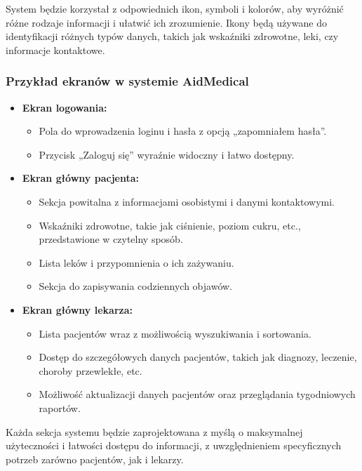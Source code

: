 \quad System będzie korzystał z odpowiednich ikon, symboli i kolorów, aby wyróżnić różne rodzaje informacji i ułatwić ich zrozumienie. Ikony będą używane do identyfikacji różnych typów danych, takich jak wskaźniki zdrowotne, leki, czy informacje kontaktowe.

\subsubsection{Przykład ekranów w systemie AidMedical}

\begin{itemize}
  \item \textbf{Ekran logowania:}
    \begin{itemize}
      \item Pola do wprowadzenia loginu i hasła z opcją „zapomniałem hasła”.
      \item Przycisk „Zaloguj się” wyraźnie widoczny i łatwo dostępny.
    \end{itemize}
  \item \textbf{Ekran główny pacjenta:}
    \begin{itemize}
      \item Sekcja powitalna z informacjami osobistymi i danymi kontaktowymi.
      \item Wskaźniki zdrowotne, takie jak ciśnienie, poziom cukru, etc., przedstawione w czytelny sposób.
      \item Lista leków i przypomnienia o ich zażywaniu.
      \item Sekcja do zapisywania codziennych objawów.
    \end{itemize}
  \item \textbf{Ekran główny lekarza:}
    \begin{itemize}
      \item Lista pacjentów wraz z możliwością wyszukiwania i sortowania.
      \item Dostęp do szczegółowych danych pacjentów, takich jak diagnozy, leczenie, choroby przewlekłe, etc.
      \item Możliwość aktualizacji danych pacjentów oraz przeglądania tygodniowych raportów.
    \end{itemize}
\end{itemize}

\quad Każda sekcja systemu będzie zaprojektowana z myślą o maksymalnej użyteczności i łatwości dostępu do informacji, z uwzględnieniem specyficznych potrzeb zarówno pacjentów, jak i lekarzy.

% 


